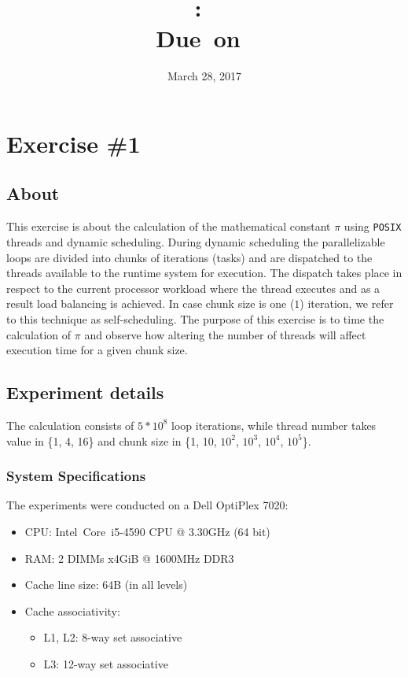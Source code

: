 \documentclass{article}
\title{
\vspace{2in}
\textmd{\textbf{\hmwkClass:\ \hmwkTitle}}\\
\normalsize\vspace{0.1in}\small{Due\ on\ \hmwkDueDate}\\
\vspace{0.1in}\large{\textit{\hmwkClassInstructor}}
\vspace{3in}
}
\author{\textbf{\hmwkAuthorName}}
\date{March 28, 2017} %
\begin{document}
\maketitle


\newpage
\tableofcontents
\newpage


\section{Exercise \#1}
\subsection{About}
This exercise is about the calculation of the mathematical constant $\pi$ using \texttt{POSIX}
threads and dynamic scheduling. During dynamic scheduling the parallelizable loops are divided
into chunks of iterations (tasks) and are dispatched to the threads available to the runtime
system for execution. The dispatch takes place in respect to the current processor workload
where the thread executes and as a result load balancing is achieved. In case chunk size is
one ($1$) iteration, we refer to this technique as self-scheduling. The purpose of this
exercise is to time the calculation of $\pi$ and observe how altering the number of threads
will affect execution time for a given chunk size.

\subsection{Experiment details}

The calculation consists of $5*10^8$ loop iterations, while thread number takes value in \{1, 4, 16\} and
chunk size in \{1, 10, $10^2$, $10^3$, $10^4$, $10^5$\}.

\subsubsection{System Specifications}
The experiments were conducted on a Dell OptiPlex 7020:
\begin{itemize}
 \item CPU: Intel\textregistered \ Core\texttrademark \ i5-4590 CPU @ 3.30GHz (64 bit)
 \item RAM: 2 DIMMs x4GiB @ 1600MHz DDR3
 \item Cache line size: 64B (in all levels)
 \item Cache associativity:
 \begin{itemize}
  \item L1, L2: 8-way set associative
  \item L3: 12-way set associative
 \end{itemize}
\end{itemize}
\end{document}

